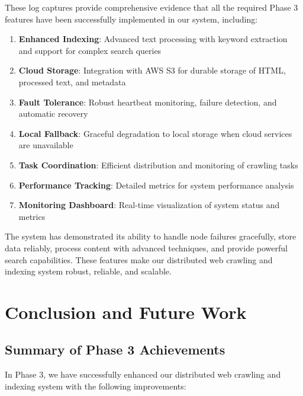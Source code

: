 \documentclass[12pt]{article}
\begin{document}
These log captures provide comprehensive evidence that all the required Phase 3 features have been successfully implemented in our system, including:

\begin{enumerate}
    \item \textbf{Enhanced Indexing}: Advanced text processing with keyword extraction and support for complex search queries
    \item \textbf{Cloud Storage}: Integration with AWS S3 for durable storage of HTML, processed text, and metadata
    \item \textbf{Fault Tolerance}: Robust heartbeat monitoring, failure detection, and automatic recovery
    \item \textbf{Local Fallback}: Graceful degradation to local storage when cloud services are unavailable
    \item \textbf{Task Coordination}: Efficient distribution and monitoring of crawling tasks
    \item \textbf{Performance Tracking}: Detailed metrics for system performance analysis
    \item \textbf{Monitoring Dashboard}: Real-time visualization of system status and metrics
\end{enumerate}

The system has demonstrated its ability to handle node failures gracefully, store data reliably, process content with advanced techniques, and provide powerful search capabilities. These features make our distributed web crawling and indexing system robust, reliable, and scalable.

\section{Conclusion and Future Work}
\subsection{Summary of Phase 3 Achievements}
In Phase 3, we have successfully enhanced our distributed web crawling and indexing system with the following improvements:
\end{document}

